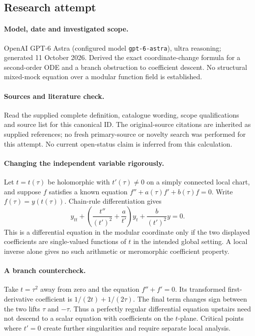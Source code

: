 \documentclass[11pt]{article}
\begin{document}
\subsection{Research attempt}
\paragraph{Model, date and investigated scope.}
OpenAI GPT-6 Astra (configured model \texttt{gpt-6-astra}), ultra reasoning; generated 11 October 2026. Derived the exact coordinate-change formula for a second-order ODE and a branch obstruction to coefficient descent. No structural mixed-mock equation over a modular function field is established.

\paragraph{Sources and literature check.}
Read the supplied complete definition, catalogue wording, scope qualifications and source list for this canonical ID. The original-source citations are inherited as supplied references; no fresh primary-source or novelty search was performed for this attempt. No current open-status claim is inferred from this calculation.

\paragraph{Changing the independent variable rigorously.}Let \(t=t(\tau)\) be holomorphic with \(t'(\tau)\ne0\) on a simply connected local chart, and suppose \(f\) satisfies a known equation \(f''+a(\tau)f'+b(\tau)f=0\). Write \(f(\tau)=y(t(\tau))\). Chain-rule differentiation gives
\[y_{tt}+\left(\frac{t''}{(t')^2}+\frac a{t'}\right)y_t+\frac b{(t')^2}y=0.
\]
This is a differential equation in the modular coordinate only if the two displayed coefficients are single-valued functions of \(t\) in the intended global setting. A local inverse alone gives no such arithmetic or meromorphic coefficient property.
\paragraph{A branch countercheck.}Take \(t=\tau^2\) away from zero and the equation \(f''+f'=0\). Its transformed first-derivative coefficient is \(1/(2t)+1/(2\tau)\). The final term changes sign between the two lifts \(\tau\) and \(-\tau\). Thus a perfectly regular differential equation upstairs need not descend to a scalar equation with coefficients on the \(t\)-plane. Critical points where \(t'=0\) create further singularities and require separate local analysis.
\end{document}
